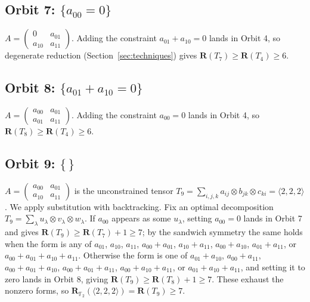 \documentclass[11pt]{article}
\theoremstyle{definition}
\newcommand{\F}{\mathbb{F}}
\newcommand{\R}{\mathbf{R}}
\newcommand{\Rk}[2]{\mathbf{R}_{#1}(#2)}
\newcommand{\mmt}[3]{\langle #1,#2,#3\rangle}
\begin{document}
\subsection*{Orbit 7: $\{a_{00}=0\}$}
$A=
\begin{pmatrix}0 & a_{01} \\a_{10}&a_{11}
\end{pmatrix}$. Adding the constraint
$a_{01}+a_{10}=0$ lands in Orbit 4, so degenerate reduction
(Section~\ref{sec:techniques}) gives $\R(T_7)\ge\R(T_4)\ge 6$.

\subsection*{Orbit 8: $\{a_{01}+a_{10}=0\}$}
$A=
\begin{pmatrix}a_{00} & a_{01} \\a_{01}&a_{11}
\end{pmatrix}$. Adding the constraint
$a_{00}=0$ lands in Orbit 4, so $\R(T_8)\ge\R(T_4)\ge 6$.

\subsection*{Orbit 9: $\{\,\}$}
$A=
\begin{pmatrix}a_{00} & a_{01} \\a_{10}&a_{11}
\end{pmatrix}$ is the unconstrained
tensor $T_9=\sum_{i,j,k}a_{ij}\otimes b_{jk}\otimes c_{ki}=\mmt{2}{2}{2}$. We apply
substitution with backtracking. Fix an optimal decomposition
$T_9=\sum_\lambda u_\lambda\otimes v_\lambda\otimes w_\lambda$. If $a_{00}$ appears
as some $u_\lambda$, setting $a_{00}=0$ lands in Orbit 7 and gives
$\R(T_9)\ge\R(T_7)+1\ge 7$; by the sandwich symmetry the same holds when the form
is any of $a_{01}$, $a_{10}$, $a_{11}$, $a_{00}+a_{01}$, $a_{10}+a_{11}$,
$a_{00}+a_{10}$, $a_{01}+a_{11}$, or $a_{00}+a_{01}+a_{10}+a_{11}$. Otherwise the
form is one of $a_{01}+a_{10}$, $a_{00}+a_{11}$, $a_{00}+a_{01}+a_{10}$,
$a_{00}+a_{01}+a_{11}$, $a_{00}+a_{10}+a_{11}$, or $a_{01}+a_{10}+a_{11}$, and
setting it to zero lands in Orbit 8, giving $\R(T_9)\ge\R(T_8)+1\ge 7$. These
exhaust the nonzero forms, so $\Rk{\F_2}{\mmt{2}{2}{2}}=\R(T_9)\ge 7$.
\end{document}
